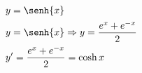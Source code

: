 \begin{ex}
\begin{align}
&y=\senh{x}\nonumber\\
&y=\senh{x} \Rightarrow y=\frac{e^{x}+e^{-x}}{2}\nonumber\\
&y'=\frac{e^{x}+e^{-x}}{2}=\cosh{x}\nonumber
\end{align}
\end{ex}
